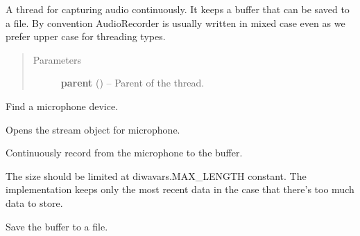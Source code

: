 \documentclass[letterpaper,10pt,english]{sphinxmanual}
\begin{document}
\begin{fulllineitems}
\label{threads:threads.audiorecorder.AudioRecorder}
A thread for capturing audio continuously.
It keeps a buffer that can be saved to a file.
By convention AudioRecorder is usually written in mixed case
even as we prefer upper case for threading types.
\begin{quote}\begin{description}
\item[{Parameters}] \leavevmode
\textbf{parent} () -- Parent of the thread.

\end{description}\end{quote}

\begin{fulllineitems}
\label{threads:threads.audiorecorder.AudioRecorder.find_input_device}
Find a microphone device.

\end{fulllineitems}


\begin{fulllineitems}
\label{threads:threads.audiorecorder.AudioRecorder.open_mic_stream}
Opens the stream object for microphone.

\end{fulllineitems}


\begin{fulllineitems}
\label{threads:threads.audiorecorder.AudioRecorder.run}
Continuously record from the microphone to the buffer.

The size should be limited at diwavars.MAX\_LENGTH constant.
The implementation keeps only the most recent data in the
case that there's too much data to store.

\end{fulllineitems}


\begin{fulllineitems}
\label{threads:threads.audiorecorder.AudioRecorder.save}
Save the buffer to a file.


\end{fulllineitems}
\end{fulllineitems}
\end{document}

